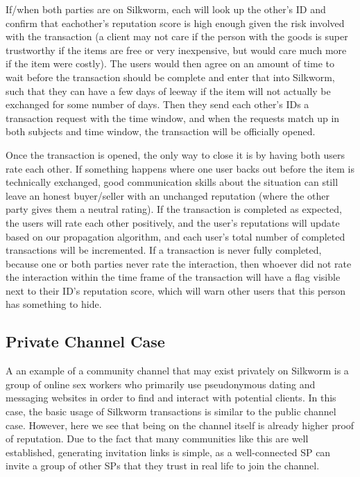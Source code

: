 \documentclass[letterpaper,twocolumn,10pt]{article}
\begin{document}
If/when both parties are on Silkworm, each will look up the other's ID and confirm that eachother's reputation score is high enough given the risk involved with the transaction (a client may not care if the person with the goods is super trustworthy if the items are free or very inexpensive, but would care much more if the item were costly). The users would then agree on an amount of time to wait before the transaction should be complete and enter that into Silkworm, such that they can have a few days of leeway if the item will not actually be exchanged for some number of days. Then they send each other's IDs a transaction request with the time window, and when the requests match up in both subjects and time window, the transaction will be officially opened.

Once the transaction is opened, the only way to close it is by having both users rate each other. If something happens where one user backs out before the item is technically exchanged, good communication skills about the situation can still leave an honest buyer/seller with an unchanged reputation (where the other party gives them a neutral rating). If the transaction is completed as expected, the users will rate each other positively, and the user's reputations will update based on our propagation algorithm, and each user's total number of completed transactions will be incremented. If a transaction is never fully completed, because one or both parties never rate the interaction, then whoever did not rate the interaction within the time frame of the transaction will have a flag visible next to their ID's reputation score, which will warn other users that this person has something to hide. 

\subsection{Private Channel Case}
A an example of a community channel that may exist privately on Silkworm is a group of online sex workers who primarily use pseudonymous dating and messaging websites in order to find and interact with potential clients. In this case, the basic usage of Silkworm transactions is similar to the public channel case. However, here we see that being on the channel itself is already higher proof of reputation. Due to the fact that many communities like this are well established, generating invitation links is simple, as a well-connected SP can invite a group of other SPs that they trust in real life to join the channel. 
\end{document}
